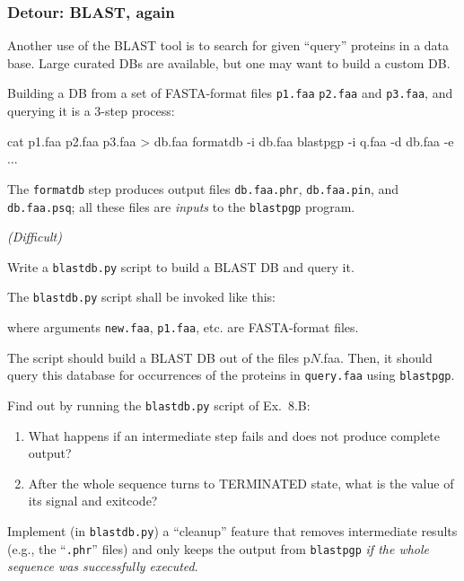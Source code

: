 \documentclass[english,serif,mathserif,xcolor=pdftex,dvipsnames,table]{beamer}
\begin{document}
\begin{frame}[fragile]
  \frametitle{Detour: BLAST, again}

  Another use of the BLAST tool is to search for given ``query''
  proteins in a data base.  Large curated DBs are available, but one
  may want to build a custom DB.

  \+
  Building a DB from a set of FASTA-format files \texttt{p1.faa}
  \texttt{p2.faa} and \texttt{p3.faa}, and querying it is a 3-step
  process:
\begin{sh}
  cat p1.faa p2.faa p3.faa > db.faa
  formatdb -i db.faa
  blastpgp -i q.faa -d db.faa -e ...
\end{sh}

  \+ The \texttt{formatdb} step produces output files
  \texttt{db.faa.phr}, \texttt{db.faa.pin}, and \texttt{db.faa.psq}; all
  these files are \emph{inputs} to the \texttt{blastpgp} program.
\end{frame}


\begin{frame}[fragile]
  \begin{exercise*}[8.B] \emph{(Difficult)}

    Write a \texttt{blastdb.py} script to build a BLAST DB and query it.

    \+
    The \texttt{blastdb.py} script shall be invoked like this:
    where arguments \texttt{new.faa}, \texttt{p1.faa}, etc. are FASTA-format files.

    \+
    The script should build a BLAST DB out of the files {p$N$.faa}.
    Then, it should query this database for occurrences of the
    proteins in \texttt{query.faa} using \texttt{blastpgp}.
  \end{exercise*}
\end{frame}


\begin{frame}
  \begin{exercise*}[8.C]
    Find out by running the \texttt{blastdb.py} script of Ex.~8.B:

    \+
    \begin{enumerate}
    \item What happens if an intermediate step fails and does not
      produce complete output?

      \+
    \item After the whole sequence turns to TERMINATED state, what is
      the value of its signal and exitcode?
    \end{enumerate}
  \end{exercise*}

  \+
  \begin{exercise*}[8.D]
    Implement (in \texttt{blastdb.py}) a ``cleanup'' feature that removes
    intermediate results (e.g., the ``\texttt{.phr}'' files) and only keeps the
    output from \texttt{blastpgp} \emph{if the whole sequence was successfully
      executed}.
  \end{exercise*}
\end{frame}
\end{document}
